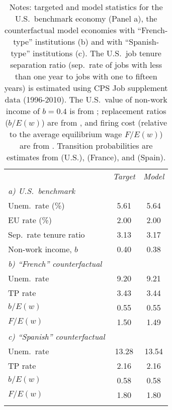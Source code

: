 \begin{table}[!h]
	\centering
	\label{tab:targets}
	\begin{tabular}{l c c}
		\hline \hline
		\addlinespace
		\hspace{250pt} & \textit{Target} & \textit{Model} \\ 
		\addlinespace
		\addlinespace
		\addlinespace
		\textit{a) U.S.\ benchmark} & & \\ 
		\hspace{10pt} Unem.\ rate (\%) & 5.61 & 5.64 \\ 
		\hspace{10pt} EU rate  (\%) & 2.00 & 2.00 \\ 
		\hspace{10pt} Sep.\ rate tenure ratio & 3.13 & 3.17 \\ 
		\hspace{10pt} Non-work income, $b$ & 0.40 & 0.38 \\ 
		\addlinespace
		\textit{b) ``French'' counterfactual} & & \\ 
		\hspace{10pt} Unem.\ rate & 9.20 & 9.21 \\ 
		\hspace{10pt} TP rate & 3.43 & 3.44 \\ 
		\hspace{10pt} $b/E(w)$ & 0.55 & 0.55 \\ 
		\hspace{10pt} $F/E(w)$ & 1.50 & 1.49 \\ 
		\addlinespace
		\textit{c) ``Spanish'' counterfactual} & & \\ 
		\hspace{10pt} Unem.\ rate & 13.28 & 13.54 \\ 
		\hspace{10pt} TP rate & 2.16 & 2.16 \\ 
		\hspace{10pt} $b/E(w)$ & 0.58 & 0.58 \\ 
		\hspace{10pt} $F/E(w)$ & 1.80 & 1.80 \\ 
		\addlinespace
		\addlinespace
		\hline \hline
	\end{tabular}
	\caption*{\footnotesize Notes: targeted and model statistics for the U.S.\ benchmark economy (Panel a), the counterfactual model economies with ``French-type'' institutions (b) and with ``Spanish-type'' institutions (c). The U.S.\ job tenure separation ratio (sep.\ rate of jobs with less than one year to jobs with one to fifteen years) is estimated using CPS Job supplement data (1996-2010). The U.S.\ value of non-work income of $b=0.4$ is from \cite{shimer:2005:AER}; replacement ratios ($b/E(w)$) are from \cite{bentolila_cahuc_dolado_lebarbanchon:2012:EJ}, and firing cost (relative to the average equilibrium wage $F/E(w)$) are from \cite{cahuc_charlot_malherbet:2016:IER}. Transition probabilities are estimates from \cite{jung_kuhn:2014:EJ} (U.S.), \cite{gw2015} (France), and \cite{Silva_Vazquez_Grenno:2013:LabourEcon} (Spain).}
\end{table}
